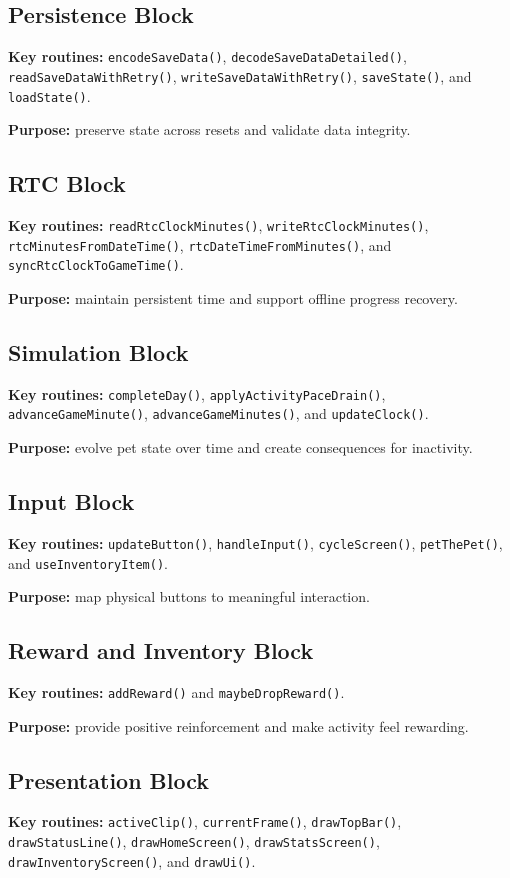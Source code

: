 \documentclass[conference]{IEEEtran}
\begin{document}
\subsection{Persistence Block}
\textbf{Key routines:} \texttt{encodeSaveData()}, \texttt{decodeSaveDataDetailed()}, \texttt{readSaveDataWithRetry()}, \texttt{writeSaveDataWithRetry()}, \texttt{saveState()}, and \texttt{loadState()}.

\textbf{Purpose:} preserve state across resets and validate data integrity.

\subsection{RTC Block}
\textbf{Key routines:} \texttt{readRtcClockMinutes()}, \texttt{writeRtcClockMinutes()}, \texttt{rtcMinutesFromDateTime()}, \texttt{rtcDateTimeFromMinutes()}, and \texttt{syncRtcClockToGameTime()}.

\textbf{Purpose:} maintain persistent time and support offline progress recovery.

\subsection{Simulation Block}
\textbf{Key routines:} \texttt{completeDay()}, \texttt{applyActivityPaceDrain()}, \texttt{advanceGameMinute()}, \texttt{advanceGameMinutes()}, and \texttt{updateClock()}.

\textbf{Purpose:} evolve pet state over time and create consequences for inactivity.

\subsection{Input Block}
\textbf{Key routines:} \texttt{updateButton()}, \texttt{handleInput()}, \texttt{cycleScreen()}, \texttt{petThePet()}, and \texttt{useInventoryItem()}.

\textbf{Purpose:} map physical buttons to meaningful interaction.

\subsection{Reward and Inventory Block}
\textbf{Key routines:} \texttt{addReward()} and \texttt{maybeDropReward()}.

\textbf{Purpose:} provide positive reinforcement and make activity feel rewarding.

\subsection{Presentation Block}
\textbf{Key routines:} \texttt{activeClip()}, \texttt{currentFrame()}, \texttt{drawTopBar()}, \texttt{drawStatusLine()}, \texttt{drawHomeScreen()}, \texttt{drawStatsScreen()}, \texttt{drawInventoryScreen()}, and \texttt{drawUi()}.
\end{document}
